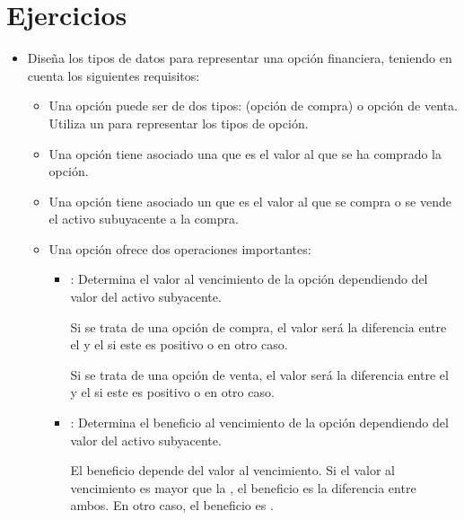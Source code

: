 \section{Ejercicios}

\begin{itemize}

\item
Diseña los tipos de datos para representar una opción financiera, teniendo en cuenta los siguientes requisitos:

\begin{itemize}

\item Una opción puede ser de dos tipos:  (opción de compra) o
       opción de venta. Utiliza un  para
      representar los tipos de opción.

\item Una opción tiene asociado una  que es el valor al que se
      ha comprado la opción.

\item Una opción tiene asociado un  que es el valor al que se
      compra o se vende el activo subuyacente a la compra.

\item Una opción ofrece dos operaciones importantes:

  \begin{itemize}

    \item {}: Determina el valor al
          vencimiento de la opción dependiendo del valor del activo subyacente.

          Si se trata de una opción de compra, el valor será la diferencia entre
          el  y el  si este es positivo o
           en otro caso.

          Si se trata de una opción de venta, el valor será la diferencia entre
          el  y el  si este es positivo o
           en otro caso. 

    \item {}: Determina el
          beneficio al vencimiento de la opción dependiendo del valor del activo
          subyacente.

          El beneficio depende del valor al vencimiento. Si el valor al vencimiento
          es mayor que la , el beneficio es la diferencia entre ambos.
          En otro caso, el beneficio es .


\end{itemize}
\end{itemize}
\end{itemize}
